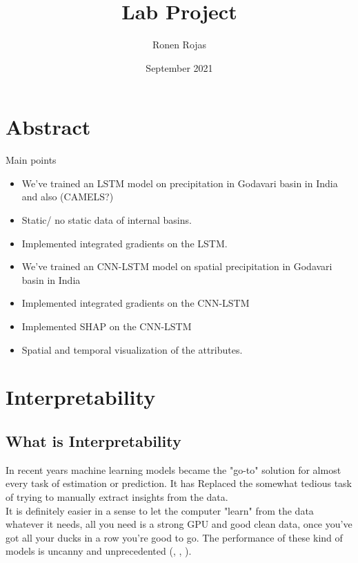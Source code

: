 \documentclass{article}
\title{Lab Project}
\author{Ronen Rojas}
\date{September 2021}
\begin{document}
\maketitle
\tableofcontents


\newpage
\section{Abstract} 

Main points
\begin{itemize}
	\item We've trained an LSTM model on precipitation in Godavari basin in India and also (CAMELS?)
	\item Static/ no static data of internal basins.
	\item Implemented integrated gradients on the LSTM.
	\item We've trained an CNN-LSTM model on spatial precipitation in Godavari basin in India
	\item Implemented integrated gradients on the CNN-LSTM 
	\item Implemented SHAP on the CNN-LSTM 
	\item Spatial and temporal visualization of the attributes.

\end{itemize}



\newpage
\section{Interpretability}

\subsection{What is Interpretability} 

In recent years machine learning models became the "go-to" solution for almost every task of estimation or prediction. It has Replaced the somewhat tedious task of trying to manually extract insights from the data.\\

It is definitely easier in a sense to let the computer "learn" from the data whatever it needs, all you need is a strong GPU and good clean data, once you've got all your ducks in a row you're good to go. The performance of these kind of models is uncanny and unprecedented (\cite{he2015deep}, \cite{DBLP:journals/corr/abs-1805-01890}, \cite{DBLP:journals/corr/abs-1905-01392}).\\
\end{document}
